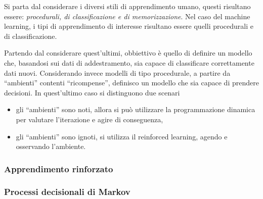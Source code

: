 \documentclass{subfiles}
\begin{document}
Si parta dal considerare i diversi stili di apprendimento umano, questi risultano essere: \emph{procedurali, \emph{di} classificazione \emph{e di} memorizzazione}.
Nel caso del machine learning, i tipi di apprendimento di interesse risultano essere quelli procedurali e di classificazione.

Partendo dal considerare quest'ultimi, obbiettivo è quello di definire un modello che, basandosi sui dati di addestramento,
sia capace di classificare correttamente dati nuovi. Considerando invece modelli di tipo procedurale, a partire da ``ambienti'' contenti ``ricompense'',
definisco un modello che sia capace di prendere decisioni.
In quest'ultimo caso si distinguono due scenari
\begin{itemize}
    \item gli ``ambienti'' sono noti, allora si può utilizzare la programmazione dinamica per valutare l'iterazione e agire di conseguenza,
    \item gli ``ambienti'' sono ignoti, si utilizza il reinforced learning, agendo e osservando l'ambiente.
\end{itemize}

\subsubsection{Apprendimento rinforzato}


\subsubsection{Processi decisionali di Markov}

\end{document}
